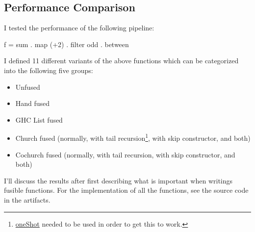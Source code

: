 \subsection{Performance Comparison}
I tested the performance of the following pipeline:
\begin{spec}
f = sum . map (+2) . filter odd . between
\end{spec}
I defined 11 different variants of the above functions which can be categorized into the following five groups:
\begin{itemize}[noitemsep]
\item Unfused
\item Hand fused
\item GHC List fused
\item Church fused (normally, with tail recursion\footnote{\href{https://gitlab.haskell.org/ghc/ghc/-/wikis/one-shot}{oneShot} needed to be used in order to get this to work.}, with skip constructor, and both)
\item Cochurch fused (normally, with tail recursion, with skip constructor, and both)
\end{itemize}

I'll discuss the results after first describing what is important when writings fusible functions.  For the implementation of all the functions, see the source code in the artifacts.

